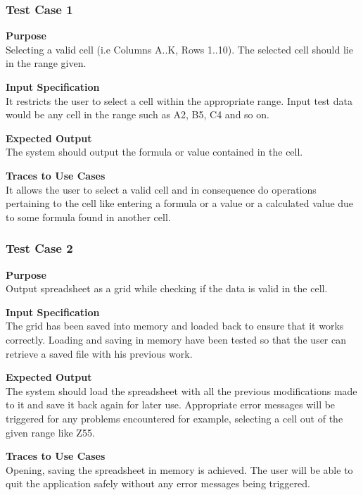 \documentclass[12pt]{article}
\begin{document}
\subsubsection{Test Case 1} \label{tc:1}

\noindent
{\bf Purpose}\\
Selecting a valid cell (i.e Columns A..K, Rows 1..10). The selected cell should lie in the range given.

\noindent
{\bf Input Specification}\\
It restricts the user to select a cell within the appropriate range. Input test data would be any cell in the range such as A2, B5, C4 and so on. 

\noindent
{\bf Expected Output}\\
The system should output the formula or value contained in the cell.

\noindent
{\bf Traces to Use Cases}\\
It allows the user to select a valid cell and in consequence do operations pertaining to the cell like entering a formula or a value or a calculated value due to some formula found in another cell.



\subsubsection{Test Case 2} \label{tc:1}

\noindent
{\bf Purpose}\\
Output spreadsheet as a grid while checking if the data is valid in the cell.

\noindent
{\bf Input Specification}\\
The grid has been saved into memory and loaded back to ensure that it works correctly. Loading and saving in memory have been tested so that the user can retrieve a saved file with his previous work.

\noindent
{\bf Expected Output}\\
The system should load the spreadsheet with all the previous modifications made to it and save it back again for later use. Appropriate error messages will be triggered for any problems encountered for example, selecting a cell out of the given range like Z55.

\noindent
{\bf Traces to Use Cases}\\
Opening, saving the spreadsheet in memory is achieved. The user will be able to quit the application safely without any error messages being triggered.
\end{document}
